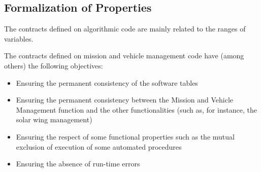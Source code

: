 \documentclass[10pt,a4paper,twocolumn]{article}
\begin{document}

\subsection{Formalization of Properties}

The contracts defined on algorithmic code are mainly related to the ranges of variables.


The contracts defined on mission and vehicle management code have (among others) the following objectives:

\begin{itemize}
\item Ensuring the permanent consistency of the software tables
\item Ensuring the permanent consistency between the Mission and Vehicle Management function and the other functionalities (such as, for instance, the solar wing management)
\item Ensuring the respect of some functional properties such as the mutual exclusion of execution of some automated procedures
\item Ensuring the absence of run-time errors
\end{itemize}
\end{document}
